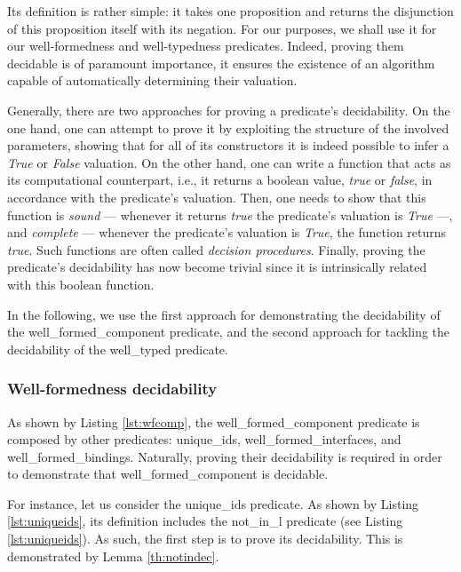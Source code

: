 	\noindent Its definition is rather simple: it takes one proposition and returns the disjunction of this 
	proposition itself with its negation. For our purposes, we shall use it for our
	well-formedness and well-typedness predicates. Indeed, proving them decidable is of 
	paramount importance, it ensures the existence of an algorithm capable of automatically 
	determining their valuation.

	Generally, there are two approaches for proving a predicate's decidability. On the one hand,
	one can attempt to prove it by exploiting the structure of the involved parameters, showing that for all
	of its constructors it is indeed possible to infer a \textit{True} or \textit{False} valuation. 
	On the other hand, one can	write a function that acts as its computational counterpart, i.e.,
	it returns a boolean value, \textit{true} or \textit{false}, in accordance with the predicate's 
	valuation. Then, one needs to show that this function is \textit{sound} --- whenever it returns 
	\textit{true} the predicate's valuation is \textit{True} ---, and \textit{complete} --- whenever
	 the predicate's valuation is \textit{True}, the function returns \textit{true}. Such 
	 functions are often called \textit{decision procedures}. Finally, proving the predicate's decidability
	 has now become trivial since it is intrinsically related with this boolean function.
	
		In the following, we use the first approach for demonstrating the decidability of the
	\textsf{well\_formed\_component} predicate, and the second approach for tackling the decidability 
	of the \textsf{well\_typed} predicate. 
		
	

\subsubsection{Well-formedness decidability}
	
				
		As shown by Listing \ref{lst:wfcomp}, the \textsf{well\_formed\_component} predicate is
	composed by other predicates: \textsf{unique\_ids}, \textsf{well\_formed\_interfaces}, and
	\textsf{well\_formed\_bindings}. Naturally, proving their decidability is required in order
	to demonstrate that  \textsf{well\_formed\_component} is decidable.	
	
		For instance, let us consider the \textsf{unique\_ids} predicate. As shown by Listing
		\ref{lst:uniqueids}, its definition includes the \textsf{not\_in\_l} predicate (see Listing \ref{lst:uniqueids}). As such,
		the first step is to prove its decidability. This is demonstrated by Lemma \ref{th:notindec}. 
				
